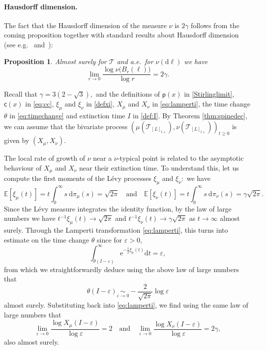 \documentclass[11pt]{article}
\newcommand{\dH}{\gamma}
\newcommand{\pp}{\mathsf{p}}
\newcommand{\cc}{\mathsf{c}}
\newcommand{\T}{\mathcal{T}}
\newcommand{\veps}{\varepsilon}
\renewcommand{\geq}{\geqslant}
\newtheorem{prop}[thm]{Proposition}
\begin{document}
\paragraph{Hausdorff dimension.}\label{section:continuous Hausdorff}

The fact that the Hausdorff dimension of the measure $\nu$ is $2 \dH$ follows from the coming proposition together with standard results about Hausdorff dimension (see e.g.~\cite[Lemma 4.1]{lyons1995ergodic} and~\cite[\S 14]{billingsley1965}):

\begin{prop}\label{prop:continuous Hausdorff} Almost surely for $\mathcal{T}$ and a.e.\ for $\nu( \mathrm{d}\ell)$ we have 
$$ \lim_{r \to 0} \frac{\log \nu \big( B_r(\ell)\big) }{\log r} = 2 \dH.$$
\end{prop}
\proof Recall that $\gamma=3(2-\sqrt{3}),$ and the definitions of $\pp(x)$ in \eqref{Stirlinglimit}, $\cc(x)$ in \eqref{eq:cc}, $\xi_\mu$ and $\xi_\nu$ in \eqref{defxi}, $X_\mu$ and $X_\nu$ in \eqref{eq:lamperti}, the time change $\theta$ in \eqref{eq:timechange} and extinction time $I$ in \eqref{def:I}. By Theorem \ref{thm:spinedec}, we can assume that the bivariate process $(\mu(\T_{[L]_{t+}}),\nu(\T_{[L]_{t+}}))_{t\geq 0}$ is given by $(X_\mu,X_\nu)$.

The local rate of growth of $\nu$ near a $\nu$-typical point is related to the asymptotic behaviour of $X_\mu$ and $X_\nu$ near their extinction time. To understand this, let us compute the first moments of the L\'evy processes $\xi_\mu$ and $\xi_\nu:$ we have 
$$ \mathbb{E}[\xi_\mu(t)] = t \int_0^{\infty} s\ \mathrm{d}\pi_\mu(s)  = \sqrt{2 \pi} \quad \mbox{and}\quad  \mathbb{E}[\xi_\nu(t)] = t \int_0^{\infty} s\ \mathrm{d}\pi_\nu(s)  = \dH \sqrt{2\pi}.$$
Since the L\'evy measure integrates the identity function, by the law of large numbers we have $t^{-1}\xi_\mu (t)  \to \sqrt{2 \pi}$   and $t^{-1}\xi_\nu (t)  \to   \dH \sqrt{2\pi}$ as $t \to \infty$ almost surely. Through the Lamperti transformation \eqref{eq:lamperti}, this turns into estimate on the time change $\theta$ since for $\veps>0$,
\[\int_{\theta(I-\veps)}^{\infty} \mathrm{e}^{-\frac12 \xi_\mu(t)}\mathrm dt=\veps, \]
from which we straightforwardly deduce using the above law of large numbers that 
\[\theta(I-\veps)\underset{\veps\to 0}\sim-\frac2{\sqrt{2\pi}}\log \veps\] almost surely. Substituting back into \eqref{eq:lamperti}, we find using the same law of large numbers that 
$$\lim_{ \varepsilon \to 0}\frac{\log X_\mu(I - \varepsilon)}{\log \varepsilon} =2\quad \mbox{and} \quad \lim_{ \varepsilon \to 0}\frac{\log X_\nu(I - \varepsilon)}{\log \varepsilon} = 2\dH,
$$ also almost surely. 
\end{document}
